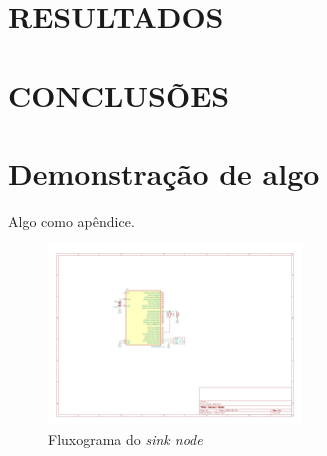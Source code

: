 \documentclass[oneside,openright,12pt]{ufsm_2015} %
\begin{document}
    
\chapter{RESULTADOS}




\chapter{CONCLUSÕES}
	 

        




	
	
	
	\apendice %

\chapter{Demonstração de algo}
        \par Algo como apêndice.  
        \par \begin{figure}[ht]
 	    \caption{\label{exepretex} Fluxograma do \textit{sink node}}
        \centering
        \includegraphics[width=0.6\textwidth]{figuras/sensor_node_v2-1.png}
        \vspace{\baselineskip} %
\end{figure}
\end{document}
